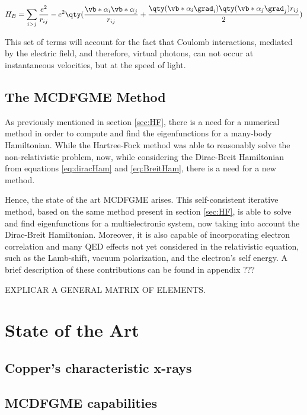   \begin{equation}
    H_B = \sum_{i>j}\frac{e^2}{r_{ij}} - e^2\qty(\frac{\vb*{\alpha}_i\vb*{\alpha}_j}{r_{ij}}+\frac{\qty(\vb*{\alpha}_i \grad_i)\qty(\vb*{\alpha}_j \grad_j)r_{ij}}{2})  
    \label{eq:BreitHam}
  \end{equation}

This set of terms will account for the fact that Coulomb interactions, mediated by the electric field, and therefore, virtual photons, can not occur at instantaneous velocities, but at the speed of light.

\subsection{The \gls{MCDFGME} Method}

As previously mentioned in section \ref{sec:HF}, there is a need for a numerical method in order to compute and find the eigenfunctions for a many-body Hamiltonian. While the Hartree-Fock method was able to reasonably solve the non-relativistic problem, now, while considering the Dirac-Breit Hamiltonian from equations \eqref{eq:diracHam} and \eqref{eq:BreitHam}, there is a need for a new method.

Hence, the state of the art \gls{MCDFGME} arises. This self-consistent iterative method, based on the same method present in section \ref{sec:HF}, is able to solve and find eigenfunctions for a multielectronic system, now taking into account the Dirac-Breit Hamiltonian. Moreover, it is also capable of incorporating electron correlation and many QED effects not yet considered in the relativistic equation, such as the Lamb-shift, vacuum polarization, and the electron's self energy.
A brief description of these contributions can be found in  appendix ???

EXPLICAR A GENERAL MATRIX OF ELEMENTS.


\section{State of the Art}


\subsection{Copper's characteristic x-rays}



\subsection{MCDFGME capabilities}

